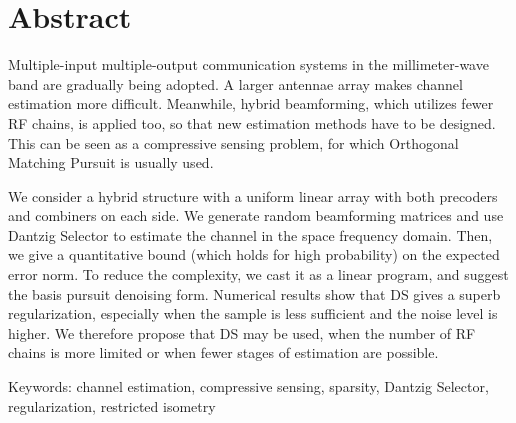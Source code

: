 
\chapter* {Abstract}

Multiple-input multiple-output communication systems in the millimeter-wave band are gradually being adopted.
A larger antennae array makes channel estimation more difficult.
Meanwhile, hybrid beamforming, which utilizes fewer RF chains, is applied too, so that new estimation methods have to be designed.
This can be seen as a compressive sensing problem, for which Orthogonal Matching Pursuit is usually used.

We consider a hybrid structure with a uniform linear array with both precoders and combiners on each side.
We generate random beamforming matrices and use Dantzig Selector to estimate the channel in the space frequency domain.
Then, we give a quantitative bound (which holds for high probability) on the expected error norm.
To reduce the complexity, we cast it as a linear program, and suggest the basis pursuit denoising form.
Numerical results show that DS gives a superb regularization, especially when the sample is less sufficient and the noise level is higher.
We therefore propose that DS may be used, when the number of RF chains is more limited or when fewer stages of estimation are possible.

Keywords: channel estimation, compressive sensing, sparsity, Dantzig Selector, regularization, restricted isometry

